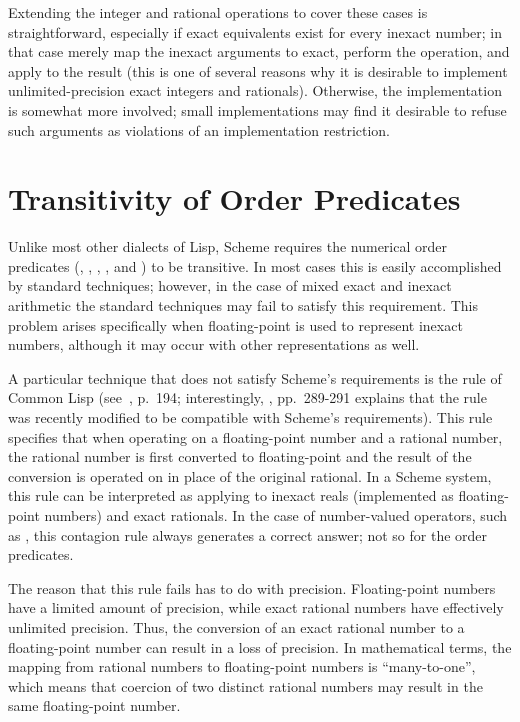 Extending the integer and rational operations to cover these cases is
straightforward, especially if exact equivalents exist for every
inexact number; in that case merely map the inexact arguments to exact,
perform the operation, and apply  to the result
(this is one of several reasons why it is desirable to implement
unlimited-precision exact integers and rationals).  Otherwise, the
implementation is somewhat more involved; small implementations may
find it desirable to refuse such arguments as violations of an
implementation restriction.

\section{Transitivity of Order Predicates}

Unlike most other dialects of Lisp, Scheme requires the numerical
order predicates (\ide{=}, \ide{<}, \ide{<=}, \ide{>}, and \ide{>=})
to be transitive.  In most cases this is easily accomplished by
standard techniques; however, in the case of mixed exact and inexact
arithmetic the standard techniques may fail to satisfy this
requirement.  This problem arises specifically when floating-point is
used to represent inexact numbers, although it may occur with other
representations as well.

A particular technique that does not satisfy Scheme's requirements is
the  rule of Common Lisp
(see~\cite{CLtL}, p.~194; interestingly, \cite{CLtL2}, pp.~289-291
explains that the rule was recently modified to be compatible with
Scheme's requirements).  This rule specifies that when operating on a
floating-point number and a rational number, the rational number is
first converted to floating-point and the result of the conversion is
operated on in place of the original rational.  In a Scheme system,
this rule can be interpreted as applying to inexact reals (implemented
as floating-point numbers) and exact rationals.  In the case of
number-valued operators, such as \ide{+}, this contagion rule always
generates a correct answer; not so for the order predicates.

The reason that this rule fails has to do with precision.
Floating-point numbers have a limited amount of precision, while exact
rational numbers have effectively unlimited precision.  Thus, the
conversion of an exact rational number to a floating-point number can
result in a loss of precision.  In mathematical terms, the mapping
from rational numbers to floating-point numbers is ``many-to-one'',
which means that coercion of two distinct rational numbers may result
in the same floating-point number.

